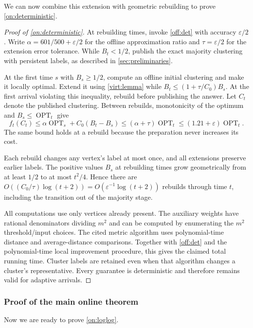 \documentclass[11pt]{article}
\newcommand{\OPT}{\operatorname{OPT}}
\begin{document}
We can now combine this extension with geometric rebuilding to prove
\cref{on:deterministic}.
\begin{proof}[Proof of \cref{on:deterministic}]
At rebuilding times, invoke \cref{off:det} with accuracy
$\varepsilon/2$. Write $\alpha=601/500+\varepsilon/2$ for the offline
approximation ratio and $\tau=\varepsilon/2$ for the extension error
tolerance. While $B_t<1/2$, publish the exact majority clustering with
persistent labels, as described in \cref{sec:preliminaries}.

At the first time $s$ with $B_s\ge1/2$, compute an offline initial
clustering and make it locally optimal. Extend it using
\cref{virt:lemma} while $B_t\le(1+\tau/C_0)B_s$. At the first
arrival violating this inequality, rebuild before publishing the
answer. Let $C_t$ denote the published clustering. Between rebuilds,
monotonicity of the optimum and $B_s\le\OPT_t$ give
\[
 f_t(C_t)
 \le\alpha\OPT_s+C_0(B_t-B_s)
 \le(\alpha+\tau)\OPT_t
 \le(1.21+\varepsilon)\OPT_t.
\]
The same bound holds at a rebuild because the preparation never increases its cost.

Each rebuild changes any vertex's label at most once, and all
extensions preserve earlier labels. The positive values $B_s$ at
rebuilding times grow geometrically from at least $1/2$ to at most
$t^2/4$. Hence there are
$O((C_0/\tau)\log(t+2))=O(\varepsilon^{-1}\log(t+2))$ rebuilds through
time $t$, including the transition out of the majority stage.

All computations use only vertices already present. The auxiliary
weights have rational denominators dividing $m^2$ and can be computed
by enumerating the $m^2$ threshold/input choices. The cited metric
algorithm uses polynomial-time distance and average-distance
comparisons. Together with \cref{off:det} and the polynomial-time
local improvement procedure, this gives the claimed total running
time. Cluster labels are retained even when that algorithm changes a
cluster's representative. Every guarantee is deterministic and
therefore remains valid for adaptive arrivals.
\end{proof}

\subsubsection{Proof of the main online theorem}

Now we are ready to prove \cref{on:loglog}.
\end{document}

